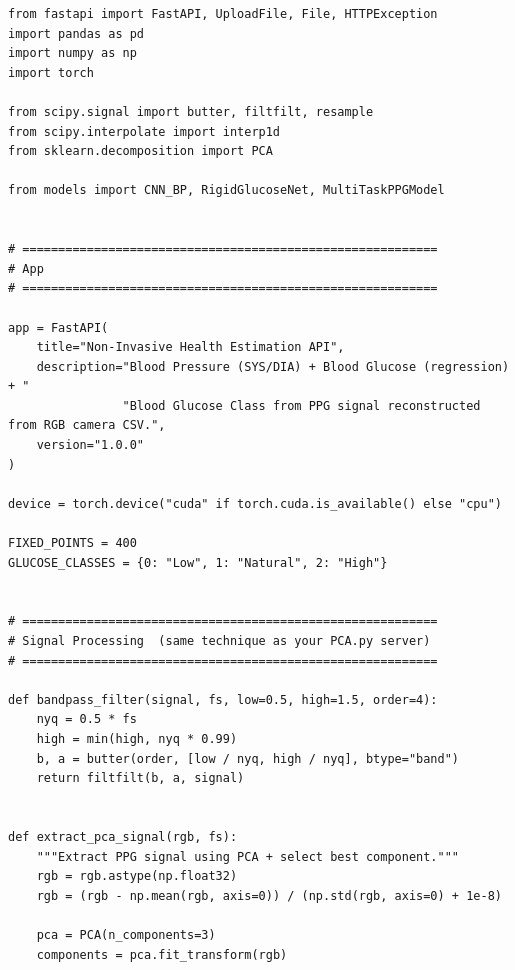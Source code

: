 \vspace{1.5em}
\begin{center}
    \begin{minipage}{\textwidth}
        \centering
        \label{lst:fastapi_backend}
        \vspace{-0.5em}
    \end{minipage}
\end{center}
\begin{verbatim}
from fastapi import FastAPI, UploadFile, File, HTTPException
import pandas as pd
import numpy as np
import torch

from scipy.signal import butter, filtfilt, resample
from scipy.interpolate import interp1d
from sklearn.decomposition import PCA

from models import CNN_BP, RigidGlucoseNet, MultiTaskPPGModel


# ==========================================================
# App
# ==========================================================

app = FastAPI(
    title="Non-Invasive Health Estimation API",
    description="Blood Pressure (SYS/DIA) + Blood Glucose (regression) + "
                "Blood Glucose Class from PPG signal reconstructed from RGB camera CSV.",
    version="1.0.0"
)

device = torch.device("cuda" if torch.cuda.is_available() else "cpu")

FIXED_POINTS = 400
GLUCOSE_CLASSES = {0: "Low", 1: "Natural", 2: "High"}


# ==========================================================
# Signal Processing  (same technique as your PCA.py server)
# ==========================================================

def bandpass_filter(signal, fs, low=0.5, high=1.5, order=4):
    nyq = 0.5 * fs
    high = min(high, nyq * 0.99)
    b, a = butter(order, [low / nyq, high / nyq], btype="band")
    return filtfilt(b, a, signal)


def extract_pca_signal(rgb, fs):
    """Extract PPG signal using PCA + select best component."""
    rgb = rgb.astype(np.float32)
    rgb = (rgb - np.mean(rgb, axis=0)) / (np.std(rgb, axis=0) + 1e-8)

    pca = PCA(n_components=3)
    components = pca.fit_transform(rgb)


\end{verbatim}
